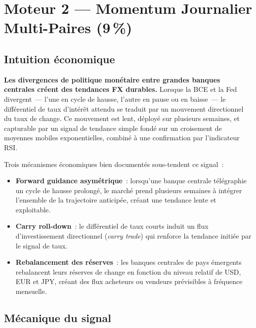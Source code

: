 \section{Moteur 2 --- Momentum Journalier Multi-Paires (9\,\%)}
\label{sec:ts_momentum}

\subsection{Intuition économique}

\begin{thesisbox}
\textbf{Les divergences de politique monétaire entre grandes banques centrales créent des tendances FX durables.} Lorsque la BCE et la Fed divergent~--- l'une en cycle de hausse, l'autre en pause ou en baisse~--- le différentiel de taux d'intérêt attendu se traduit par un mouvement directionnel du taux de change. Ce mouvement est lent, déployé sur plusieurs semaines, et capturable par un signal de tendance simple fondé sur un croisement de moyennes mobiles exponentielles, combiné à une confirmation par l'indicateur RSI.
\end{thesisbox}

Trois mécanismes économiques bien documentés sous-tendent ce signal~:

\begin{itemize}
\item \textbf{Forward guidance asymétrique}~: lorsqu'une banque centrale télégraphie un cycle de hausse prolongé, le marché prend plusieurs semaines à intégrer l'ensemble de la trajectoire anticipée, créant une tendance lente et exploitable.
\item \textbf{Carry roll-down}~: le différentiel de taux courts induit un flux d'investissement directionnel (\emph{carry trade}) qui renforce la tendance initiée par le signal de taux.
\item \textbf{Rebalancement des réserves}~: les banques centrales de pays émergents rebalancent leurs réserves de change en fonction du niveau relatif de USD, EUR et JPY, créant des flux acheteurs ou vendeurs prévisibles à fréquence mensuelle.
\end{itemize}

\subsection{Mécanique du signal}

